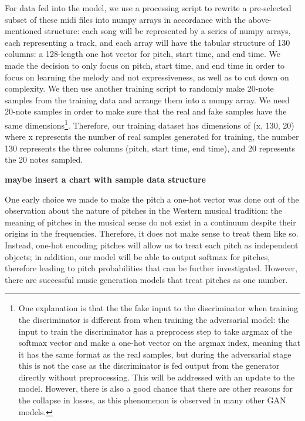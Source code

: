 \documentclass[12pt,oneside]{chicagocapstone}
\begin{document}
For data fed into the model, we use a processing script to rewrite a pre-selected subset of these midi files into numpy arrays in accordance with the above-mentioned structure: each song will be represented by a series of numpy arrays, each representing a track, and each array will have the tabular structure of 130 columns: a 128-length one hot vector for pitch, start time, and end time. We made the decision to only focus on pitch, start time, and end time in order to focus on learning the melody and not expressiveness, as well as to cut down on complexity. We then use another training script to randomly make 20-note samples from the training data and arrange them into a numpy array. We need 20-note samples in order to make sure that the real and fake samples have the same dimensions\footnote{One explanation is that the the fake input to the discriminator when training the discriminator is different from when training the adversarial model: the input to train the discriminator has a preprocess step to take argmax of the softmax vector and make a one-hot vector on the argmax index, meaning that it has the same format as the real samples, but during the adversarial stage this is not the case as the discriminator is fed output from the generator directly without preprocessing. This will be addressed with an update to the model. However, there is also a good chance that there are other reasons for the collapse in losses, as this phenomenon is observed in many other GAN models.}. Therefore, our training dataset has dimensions of (x, 130, 20) where x represents the number of real samples generated for training, the number 130 represents the three columns (pitch, start time, end time), and 20 represents the 20 notes sampled.

\textbf{maybe insert a chart with sample data structure}

One early choice we made to make the pitch a one-hot vector was done out of the observation about the nature of pitches in the Western musical tradition: the meaning of pitches in the musical sense do not exist in a continuum despite their origins in the frequencies. Therefore, it does not make sense to treat them like so. Instead, one-hot encoding pitches will allow us to treat each pitch as independent objects; in addition, our model will be able to output softmax for pitches, therefore leading to pitch probabilities that can be further investigated. However, there are successful music generation models that treat pitches as one number.

\newpage
\end{document}
